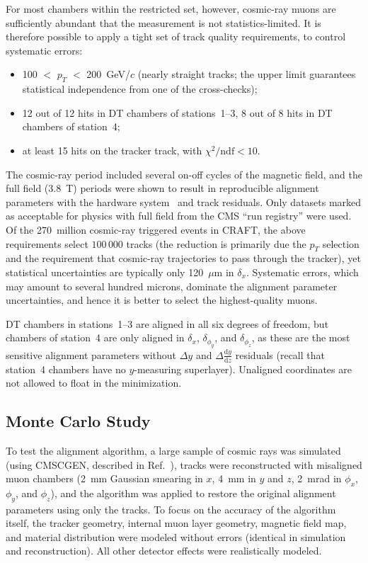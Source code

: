 For most chambers within the restricted set, however, cosmic-ray muons are
sufficiently abundant that the measurement is not statistics-limited.
It is therefore possible to apply a tight set of track quality
requirements, to control systematic errors:
\begin{itemize}
\item 100 $<$ $p_T$ $<$ 200~GeV/$c$ (nearly straight tracks; the upper
limit guarantees statistical independence from one of the cross-checks);
\item 12 out of 12 hits in DT chambers of stations~1--3, 8 out of 8 hits
in DT chambers of station~4;
\item at least 15 hits on the tracker track, with $\chi^2/\mbox{ndf} <
10$.
\end{itemize}
The cosmic-ray period included several on-off cycles of the magnetic
field, and the full field (3.8~T) periods were shown to result in
reproducible alignment parameters with the hardware
system~\cite{ref:hardware_alignment} and track residuals.  Only
datasets marked as acceptable for physics with full field from the CMS
``run registry'' \cite{ref:CRAFTGeneral} were used.  Of the
270~million cosmic-ray triggered events in CRAFT, the above
requirements select $100\,000$ tracks (the reduction is primarily due
the $p_T$ selection and the requirement that cosmic-ray trajectories
to pass through the tracker), yet statistical uncertainties are
typically only 120~$\mu$m in $\delta_x$.  Systematic errors, which may
amount to several hundred microns, dominate the alignment parameter
uncertainties, and hence it is better to select the highest-quality
muons.

DT chambers in stations~1--3 are aligned in all six degrees of
freedom, but chambers of station~4 are only aligned in $\delta_x$,
$\delta_{\phi_y}$, and $\delta_{\phi_z}$, as these are the most sensitive
alignment parameters without $\Delta y$ and $\Delta \frac{\textrm{d}y}{\textrm{d}z}$
residuals (recall that station~4 chambers have no $y$-measuring
superlayer).  Unaligned coordinates are not allowed to float in the
minimization.

\subsection{Monte Carlo Study}
\label{sec:gmaresults}

To test the alignment algorithm, a large sample of cosmic rays was
simulated (using \mbox{CMSCGEN}, described in Ref.~\cite{Biallass:2009ev}),
tracks were reconstructed with misaligned muon chambers (2~mm Gaussian
smearing in $x$, 4~mm in $y$ and $z$, 2~mrad in $\phi_x$, $\phi_y$,
and $\phi_z$), and the algorithm was applied to restore the original
alignment parameters using only the tracks.  To focus on the accuracy
of the algorithm itself, the tracker geometry, internal muon layer
geometry, magnetic field map, and material distribution were modeled
without errors (identical in simulation and reconstruction).  All
other detector effects were realistically modeled.

